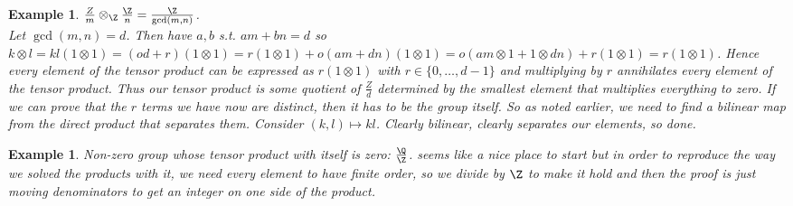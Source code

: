 \documentclass[a4paper]{article}
\newtheorem{exmp}[thm]{Example}
\begin{document}
\begin{exmp}
    $\frac{Z}{m}\otimes _\Z \frac{\Z}{n}=\frac{\Z}{\gcd\left( m,n \right) }$.
    \\Let $\gcd(m,n)=d$. Then have  $a,b$ s.t. $am+bn=d$ so  $k\otimes l=kl (1\otimes 1)=(od+r)\left( 1\otimes 1 \right) =r\left( 1\otimes 1 \right) +o\left( am+dn \right) \left( 1\otimes 1 \right) =o\left( am\otimes 1 + 1\otimes dn \right)+r\left( 1\otimes 1 \right) =r\left( 1\otimes 1 \right)  $. Hence every element of the tensor product can be expressed as $r\left( 1\otimes 1 \right) $ with $r\in \{0, \ldots ,d-1\}$ and multiplying by $r$ annihilates every element of the tensor product. Thus our tensor product is some quotient of  $\frac{Z}{d}$ determined by the smallest element that multiplies everything to zero. If we can prove that the  $r$ terms we have now are distinct, then it has to be the group itself. So as noted earlier, we need to find a bilinear map from the direct product that separates them. Consider $\left( k,l \right)\mapsto kl $. Clearly bilinear, clearly separates our elements, so done.
    
\end{exmp}
\begin{exmp}
    Non-zero group whose tensor product with itself is zero: $\frac{\Q}{\Z}$. \Q seems like a nice place to start but in order to reproduce the way we solved the products with it, we need every element to have finite order, so we divide by $\Z$ to make it hold and then the proof is just moving denominators to get an integer on one side of the product.
\end{exmp}
\end{document}
